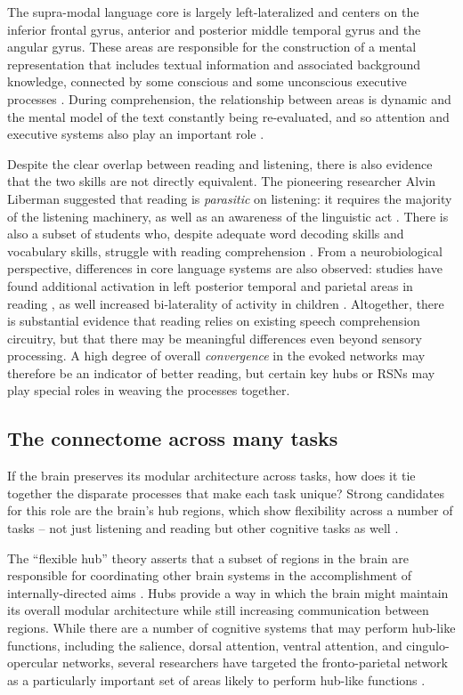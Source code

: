 The supra-modal language core is largely left-lateralized and centers on the inferior frontal gyrus, anterior and posterior middle temporal gyrus and the angular gyrus. These areas are responsible for the construction of a mental representation that includes textual information and associated background knowledge, connected by some conscious and some unconscious executive processes \citep{Kendeou2014}. During comprehension, the relationship between areas is dynamic and the mental model of the text constantly being re-evaluated, and so attention and executive systems also play an important role \citep{Spreng2013}. 

Despite the clear overlap between reading and listening, there is also evidence that the two skills are not directly equivalent. The pioneering researcher Alvin Liberman suggested that reading is \textit{parasitic} on listening: it requires the majority of the listening machinery, as well as an awareness of the linguistic act \citep{Mattingly1971}. There is also a subset of students who, despite adequate word decoding skills and vocabulary skills, struggle with reading comprehension \citep{Pimperton2010, Spencer2014}. From a neurobiological perspective, differences in core language systems are also observed: studies have found additional activation in left posterior temporal and parietal areas in reading \citep{Constable2004}, as well increased bi-laterality of activity in children \citep{Berl2011}. Altogether, there is substantial evidence that reading relies on existing speech comprehension circuitry, but that there may be meaningful differences even beyond sensory processing. A high degree of overall \textit{convergence} in the evoked networks may therefore be an indicator of better reading, but certain key hubs or RSNs may play special roles in weaving the processes together.

\subsection{The connectome across many tasks}

If the brain preserves its modular architecture across tasks, how does it tie together the disparate processes that make each task unique? Strong candidates for this role are the brain's hub regions, which show flexibility across a number of tasks -- not just listening and reading but other cognitive tasks as well \citep{Cole2014}. 

The ``flexible hub'' theory asserts that a subset of regions in the brain are responsible for coordinating other brain systems in the accomplishment of internally-directed aims \citep{Cole2007}. Hubs provide a way in which the brain might maintain its overall modular architecture while still increasing communication between regions. While there are a number of cognitive systems that may perform hub-like functions, including the salience, dorsal attention, ventral attention, and cingulo-opercular networks, several researchers have targeted the fronto-parietal network as a particularly important set of areas likely to perform hub-like functions \citep{Cole2013, Niendam2012}. 

